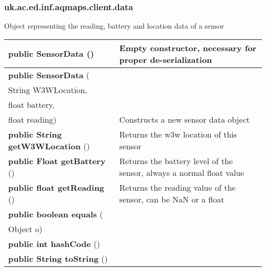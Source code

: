 \subsubsection{ uk.ac.ed.inf.aqmaps.client.data }
 { Object representing the reading, battery and location data of a sensor
 
\begin{tabular}{ p{3in}|m{3.4in}}
\textbf{public SensorData} () & Empty constructor, necessary for proper de{-}serialization\\ \hline 
\textbf{public SensorData } (\\ \hspace*{ 5pt} String W3WLocation,\\\hspace*{ 5pt} float battery,\\\hspace*{ 5pt} float reading) & Constructs a new sensor data object\\ \hline 
\textbf{public String getW3WLocation} () & Returns the w3w location of this sensor\\ \hline 
\textbf{public Float getBattery} () & Returns the battery level of the sensor, always a normal float value\\ \hline 
\textbf{public float getReading} () & Returns the reading value of the sensor, can be NaN or a float\\ \hline 
\textbf{public boolean equals } (\\ \hspace*{ 5pt} Object o) & \\ \hline 
\textbf{public int hashCode} () & \\ \hline 
\textbf{public String toString} () & \\ \hline 
\end{tabular}
}
